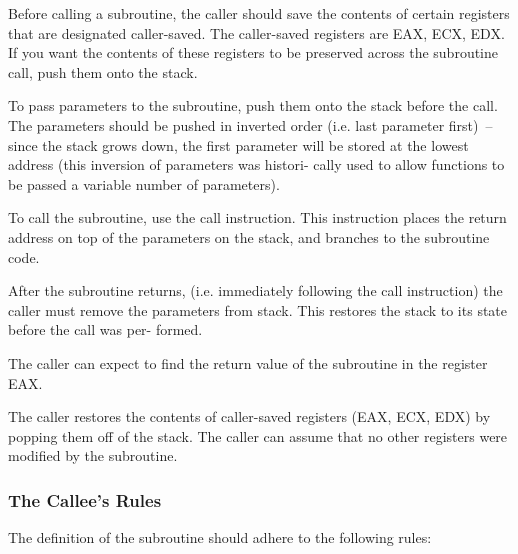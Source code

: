 \begin{numlist}
\item Before calling a subroutine, the caller should save the contents
  of certain registers that are designated caller-saved. The
  caller-saved registers are EAX, ECX, EDX. If you want the contents
  of these registers to be preserved across the subroutine call, push
  them onto the stack.
\item To pass parameters to the subroutine, push them onto the stack
  before the call. The parameters should be pushed in inverted order
  (i.e. last parameter first)~-- since the stack grows down, the first
  parameter will be stored at the lowest address (this inversion of
  parameters was histori- cally used to allow functions to be passed a
  variable number of parameters).
\item To call the subroutine, use the call instruction. This
  instruction places the return address on top of the parameters on
  the stack, and branches to the subroutine code.
\item After the subroutine returns, (i.e. immediately following the
  call instruction) the caller must remove the parameters from stack.
  This restores the stack to its state before the call was per-
  formed.
\item The caller can expect to find the return value of the subroutine
  in the register EAX.
\item The caller restores the contents of caller-saved registers (EAX,
  ECX, EDX) by popping them off of the stack. The caller can assume
  that no other registers were modified by the subroutine.
\end{numlist}

\subsubsection{The Callee's Rules}

The definition of the subroutine should adhere to the following rules:

